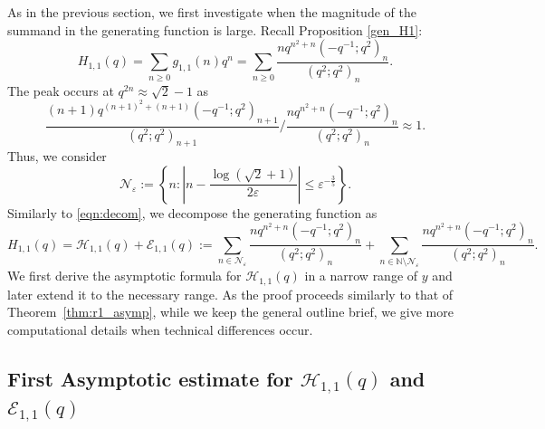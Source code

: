 \documentclass[11pt,reqno]{amsart}
\theoremstyle{remark}
\numberwithin{equation}{section}
\begin{document}
As in the previous section, we first investigate when the magnitude of the summand in the generating function is large. Recall Proposition \ref{gen_H1}:
\[
	H_{1,1}(q)=\sum_{n\ge 0} g_{1,1}(n)q^n = \sum_{n\ge 0} \frac{ n q^{n^2+n} (-q^{-1};q^2)_n}{(q^2;q^2)_n}.
\]
The peak occurs at $q^{2n} \approx \sqrt{2}-1$ as
\[
	\frac{ (n+1) q^{(n+1)^2+(n+1)} (-q^{-1};q^2)_{n+1}}{(q^2;q^2)_{n+1}} \big/ \frac{ n q^{n^2+n} (-q^{-1};q^2)_n}{(q^2;q^2)_n} \approx 1.
\]
Thus, we consider
\[
	\mathcal{N}_\varepsilon := \left\{ n : \left|n-\frac{\log(\sqrt{2}+1)}{2\varepsilon} \right| \leq \varepsilon^{-\frac35} \right\}.
\]
Similarly to \eqref{eqn:decom}, we decompose the generating function as  
\[
	H_{1,1}(q) = \mathcal{H}_{1,1}(q) + \mathcal{E}_{1,1} (q) :=
 \sum_{n \in \mathcal{N}_{\varepsilon}} \frac{ n q^{n^2+n} (-q^{-1};q^2)_n}{(q^2;q^2)_n}+ \sum_{n \in \mathbb{N} \setminus \mathcal{N}_{\varepsilon}} \frac{ n q^{n^2+n} (-q^{-1};q^2)_n}{(q^2;q^2)_n}. 
\]
We first derive the asymptotic formula for $\mathcal{H}_{1,1}(q)$ in a narrow range of $y$ and later extend it to the necessary range. As the proof proceeds similarly to that of Theorem~\ref{thm:r1_asymp}, while we keep the general outline brief, we give  more computational details when technical differences occur.



\subsection{First Asymptotic estimate for $\mathcal{H}_{1,1}(q)$ and $\mathcal{E}_{1,1}(q)$}\label{sec:H_near}
\end{document}
